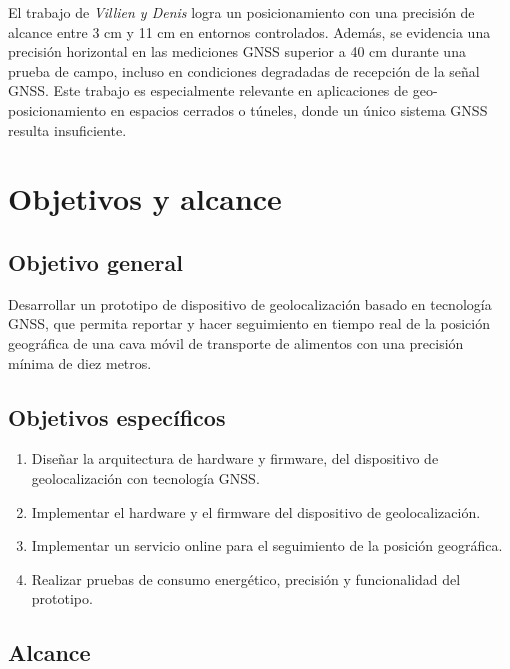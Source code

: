 El trabajo de \textit{Villien y Denis} logra un posicionamiento con una precisión de alcance entre 3 cm y 11 cm en entornos controlados. Además, se evidencia una precisión horizontal en las mediciones GNSS superior a 40 cm durante una prueba de campo, incluso en condiciones degradadas de recepción de la señal GNSS. Este trabajo es especialmente relevante en aplicaciones de geo-posicionamiento en espacios cerrados o túneles, donde un único sistema GNSS resulta insuficiente. 





\section{Objetivos y alcance}
\label{sec:objetivos}

\subsection{Objetivo general} 

Desarrollar un prototipo de dispositivo de geolocalización basado en tecnología GNSS, que permita reportar y hacer seguimiento en tiempo real de la posición geográfica de una cava móvil de transporte de alimentos con una precisión mínima de diez metros.


\subsection{Objetivos específicos} 

\begin{enumerate}
    \item Diseñar la arquitectura de hardware y firmware, del dispositivo de geolocalización con tecnología GNSS. 
    \item Implementar el hardware y el firmware del dispositivo de geolocalización.
    \item Implementar un servicio online para el seguimiento de la posición geográfica.
    \item Realizar pruebas de consumo energético, precisión y funcionalidad del prototipo.
\end{enumerate}


\subsection{Alcance} 

